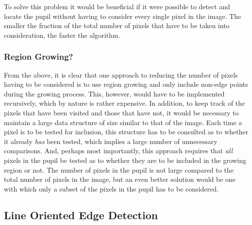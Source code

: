 To solve this problem it would be beneficial if it were possible to
detect and locate the pupil without having to consider every single
pixel in the image.  The smaller the fraction of the total number of
pixels that have to be taken into consideration, the faster the
algorithm.  

\subsubsection{Region Growing?}

From the above, it is clear that one approach to reducing the number
of pixels having to be considered is to use region growing and only
include non-edge points during the growing process.  This, however,
would have to be implemented recursively, which by nature is rather
expensive.  In addition, to keep track of the pixels that have been
visited and those that have not, it would be necessary to maintain a
large data structure of size similar to that of the image.  Each time
a pixel is to be tested for inclusion, this structure has to be
consulted as to whether it already {\em has\/} been tested, which
implies a large number of unnecessary comparisons.  And, perhaps most
importantly, this approach requires that {\em all\/} pixels in the
pupil be tested as to whether they are to be included in the growing
region or not.  The number of pixels in the pupil is not large
compared to the total number of pixels in the image, but an even
better solution would be one with which only a subset of the pixels in
the pupil has to be considered.

\subsection{Line Oriented Edge Detection}
\label{eval:approach:edge}


